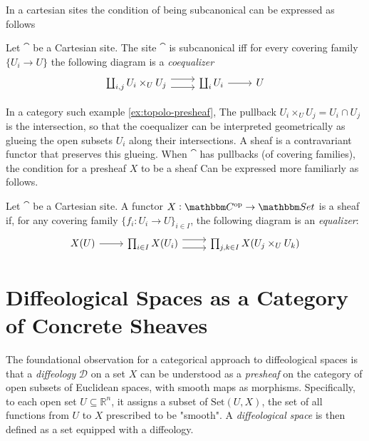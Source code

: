 \documentclass[a4paper,11pt]{article}  %
\begin{document}
In a cartesian sites the condition of being subcanonical can be expressed as follows
\begin{lemma}\label{lem:subcanon-bloh}
	Let $\cat$ be a Cartesian site.
	The site $\cat$ is subcanonical iff for every covering family $\{U_i\to U\}$ the following diagram is a \emph{coequalizer}
		\begin{equation}
			\begin{tikzcd}
				\coprod_{i,j} U_i \times_U U_j \ar[r, yshift=4px]\ar[r, yshift=-4px] & \coprod_i U_i \ar[r] & U
			\end{tikzcd}		
		\end{equation}
\end{lemma}
%
In a category such example \cref{ex:topolo-presheaf}, The pullback $U_i\times_U U_j = U_i \cap U_j$ is the intersection, so that the
coequalizer can be interpreted geometrically as glueing the open subsets $U_i$ along their intersections. 
A sheaf is a contravariant functor that preserves this glueing.
When $\cat$ has pullbacks (of covering families), the condition for a presheaf \(X\) to be a sheaf Can be expressed more familiarly as follows.

\begin{lemma}
	Let $\cat$ be a Cartesian site.
	A functor $X: \cat^\op \to \Set$ is a sheaf if, for any covering family \(\{f_i : U_i \to U\}_{i \in I}\), the following diagram is an \emph{equalizer}:
	\begin{equation}
		\begin{tikzcd}
			X(U) \ar[r] & \prod_{i \in I} X(U_i) \ar[r, yshift=4px]\ar[r, yshift=-4px] & \prod_{j,k \in I} X(U_j \times_U U_k) 
		\end{tikzcd}	
	\end{equation}
\end{lemma}


\section{ Diffeological Spaces as a Category of Concrete Sheaves}
%
The foundational observation for a categorical approach to diffeological spaces is that a \emph{diffeology} \(\mathcal{D}\) on a set \(X\) can be understood as a \emph{presheaf} on the category of open subsets of Euclidean spaces, with smooth maps as morphisms. 
Specifically, to each open set \(U \subseteq \mathbb{R}^n\), it assigns a subset of \(\text{Set}(U, X)\), the set of all functions from \(U\) to \(X\) prescribed to be "smooth". 
A \emph{diffeological space} is then defined as a set equipped with a diffeology.
\end{document}
